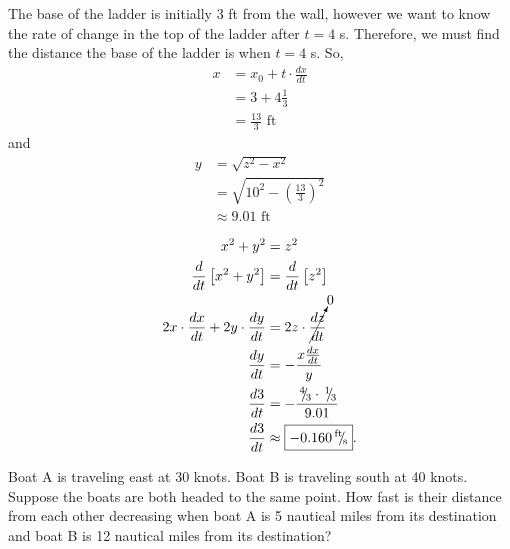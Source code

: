 \documentclass{hwset}
\begin{document}
\begin{solution}
	\begin{center}
	\end{center}
	The base of the ladder is initially $3$ ft from the wall, however we want to
	know the rate of change in the top of the ladder after $t=4$ s. Therefore, we
	must find the distance the base of the ladder is when $t=4$ s. So,
	\begin{align*}
		x &= x_0 + t\cdot \frac{dx}{dt} \\
		&= 3 + 4\frac{1}{3} \\
		&= \frac{13}{3} \text{ ft}
	\end{align*}
	and 
	\begin{align*}
		y &= \sqrt{z^2 - x^2}\\
		&= \sqrt{10^2 - \left(\frac{13}{3}\right)^2}\\
		&\approx 9.01 \text{ ft}\\
	\end{align*}
	\begin{align*}
		x^2 + y^2 &= z^2\\
		\frac{d}{dt}\left[ x^2 + y^2 \right]&= \frac{d}{dt}\left[ z^2 \right]\\
		2 x\cdot \frac{dx}{dt} + 2 y\cdot \frac{dy}{dt}&= 2 z \cdot
			\cancelto{0}{\frac{dz}{dt}} \\
		\frac{dy}{dt}&= -\dfrac{x \frac{dx}{dt}}{y} \\
		\frac{d3}{dt}&= -\dfrac{\sfrac{4}{3} \cdot \sfrac{1}{3}}{9.01} \\
		\frac{d3}{dt}&\approx \boxed{-0.160 \sfrac{\text{ft}}{\text{s}}}.
	\end{align*}
\end{solution}

\begin{problem}[3.]
	Boat A is traveling east at 30 knots. Boat B is traveling south at 40 knots.
	Suppose the boats are both headed to the same point. How fast is their
	distance from each other decreasing when boat A is 5 nautical miles from its
	destination and boat B is 12 nautical miles from its destination?
\end{problem}
\end{document}
